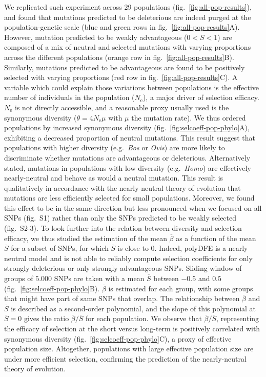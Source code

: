 \documentclass{article}
\newcommand{\Ne}{N_{\mathrm{e}}}
\newcommand{\Sphy}{S}
\newcommand{\SphyMean}{\overline{\Sphy}}
\newcommand{\divWeakAdv}{0 < \Sphy < 1}
\newcommand{\Spop}{\beta}
\newcommand{\SpopMean}{\overline{\Spop}}
\begin{document}
    We replicated such experiment across 29 populations (fig.~\ref{fig:all-pop-results}), and found that mutations predicted to be deleterious are indeed purged at the population-genetic scale (blue and green rows in fig.~\ref{fig:all-pop-results}A).
    However, mutation predicted to be weakly advantageous ($\divWeakAdv$) are composed of a mix of neutral and selected mutations with varying proportions across the different populations (orange row in fig.~\ref{fig:all-pop-results}B).
    Similarly, mutations predicted to be advantageous are found to be positively selected with varying proportions (red row in fig.~\ref{fig:all-pop-results}C).
    A variable which could explain those variations between populations is the effective number of individuals in the population ($\Ne$), a major driver of selection efficacy.
    $\Ne$ is not directly accessible, and a reasonable proxy usually used is the synonymous diversity ($\theta=4\Ne\mu$ with $\mu$ the mutation rate).
    We thus ordered populations by increased synonymous diversity (fig.~\ref{fig:selcoeff-pop-phylo}A), exhibiting a decreased proportion of neutral mutations.
    This result suggest that populations with higher diversity (e.g.~\textit{Bos} or \textit{Ovis}) are more likely to discriminate whether mutations are advantageous or deleterious.
    Alternatively stated, mutations in populations with low diversity (e.g.~\textit{Homo}) are effectively nearly-neutral and behave as would a neutral mutation.
    This result is qualitatively in accordance with the nearly-neutral theory of evolution that mutations are less efficiently selected for small populations.
    Moreover, we found this effect to be in the same direction but less pronounced when we focused on all SNPs (fig.~S1) rather than only the SNPs predicted to be weakly selected (fig.~S2-3).
    To look further into the relation between diversity and selection efficacy, we thus studied the estimation of the mean $\SpopMean$ as a function of the mean $\SphyMean$ for a subset of SNPs, for which $\SphyMean$ is close to $0$.
    Indeed, polyDFE is a nearly neutral model and is not able to reliably compute selection coefficients for only strongly deleterious or only strongly advantageous SNPs.
    Sliding window of groups of $5.000$ SNPs are taken with a mean $\SphyMean$ between $-0.5$ and $0.5$ (fig.~\ref{fig:selcoeff-pop-phylo}B).
    $\SpopMean$ is estimated for each group, with some groups that might have part of same SNPs that overlap.
    The relationship between $\SpopMean$ and $\SphyMean$ is described as a second-order polynomial, and the slope of this polynomial at $\SphyMean=0$ gives the ratio $\SpopMean/\SphyMean$ for each population.
    We observe that $\SpopMean/\SphyMean$, representing the efficacy of selection at the short versus long-term is positively correlated with synonymous diversity (fig.~\ref{fig:selcoeff-pop-phylo}C), a proxy of effective population size.
    Altogether, populations with large effective population size are under more efficient selection, confirming the prediction of the nearly-neutral theory of evolution.
\end{document}
